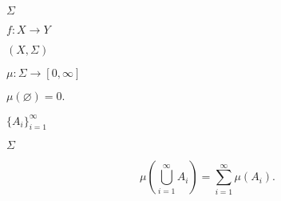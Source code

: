 \documentclass[10pt]{book}
\begin{document}
\begin{mdSnippets}
\begin{mdInlineSnippet}[025b3f94d79319f2067156076bf05243]%
$\Sigma$\end{mdInlineSnippet}%
\begin{mdInlineSnippet}[2385fde6b300ad088e0c2711c9da8a74]%
$f: X \to Y$\end{mdInlineSnippet}%
\begin{mdInlineSnippet}[4f63e1397362dfddde7f9605fc68fb64]%
$(X, \Sigma)$\end{mdInlineSnippet}%
\begin{mdInlineSnippet}%
$\mu: \Sigma \to [0, \infty]$\end{mdInlineSnippet}%
\begin{mdInlineSnippet}%
$\mu(\varnothing) = 0.$\end{mdInlineSnippet}%
\begin{mdInlineSnippet}[285e38d14735127a14e606e4b16c8dab]%
$\{A_i\}_{i=1}^\infty$\end{mdInlineSnippet}%
\begin{mdInlineSnippet}[025b3f94d79319f2067156076bf05243]%
$\Sigma$\end{mdInlineSnippet}%
\begin{mdDisplaySnippet}[23024a4bd3a28e5307ae652136fdbfca]%
\[%
\mu(\bigcup_{i=1}^\infty A_i) = \sum_{i=1}^\infty \mu(A_i).
\]%
\end{mdDisplaySnippet}%

\end{mdSnippets}
\end{document}
